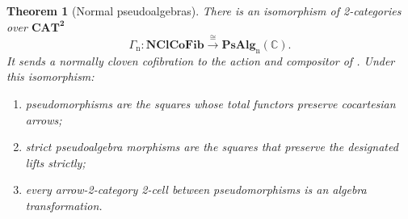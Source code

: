 \documentclass[11pt]{article}
\theoremstyle{plain}
\newtheorem{theorem}{Theorem}[section]
\theoremstyle{definition}
\theoremstyle{remark}
\newcommand{\CAT}{\mathbf{CAT}}
\newcommand{\NClCoFib}{\mathbf{NClCoFib}}
\newcommand{\PsAlg}{\mathbf{PsAlg}}
\newcommand{\C}{\mathbb{C}}
\numberwithin{equation}{section}
\begin{document}
\begin{theorem}[Normal pseudoalgebras]\label{thm:normal-pseudo}
There is an isomorphism of 2-categories over $\CAT^{\mathbf 2}$
\begin{equation}
  \Gamma_{\mathrm n}\colon
  \NClCoFib\xrightarrow{\ \cong\ }\PsAlg_{\mathrm n}(\C).
  \label{eq:normal-pseudo-comparison}
\end{equation}
It sends a normally cloven cofibration to the action and compositor of
.  Under this
isomorphism:
\begin{enumerate}[label=\textup{(\roman*)},leftmargin=2.2em]
\item pseudomorphisms are the squares whose total functors
      preserve cocartesian arrows;
\item strict pseudoalgebra morphisms are the squares that preserve the
      designated lifts strictly;
\item every arrow-2-category 2-cell between pseudomorphisms is an
      algebra transformation.
\end{enumerate}
\end{theorem}
\end{document}
